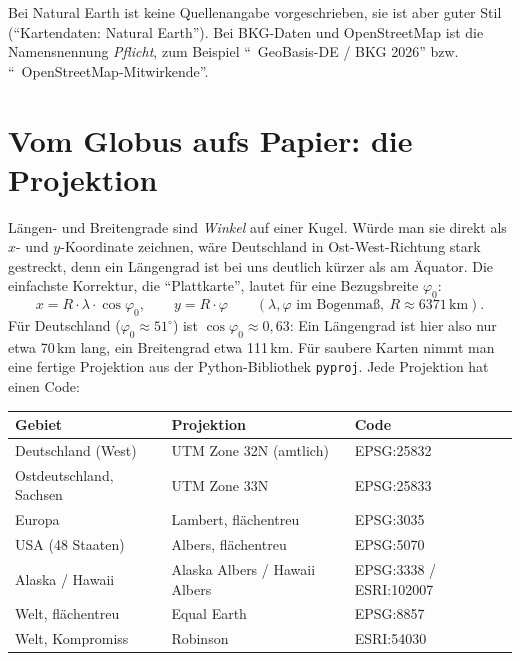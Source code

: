 \begin{hinweis}[Lizenz]
	Bei Natural Earth ist keine Quellenangabe vorgeschrieben, sie ist aber guter Stil (\enquote{Kartendaten: Natural Earth}). Bei BKG-Daten und OpenStreetMap ist die Namensnennung \textit{Pflicht}, zum Beispiel \enquote{\textcopyright\ GeoBasis-DE / BKG 2026} bzw. \enquote{\textcopyright\ OpenStreetMap-Mitwirkende}.
\end{hinweis}



\section{Vom Globus aufs Papier: die Projektion}

Längen- und Breitengrade sind \textit{Winkel} auf einer Kugel. Würde man sie direkt als $x$- und $y$-Koordinate zeichnen, wäre Deutschland in Ost-West-Richtung stark gestreckt, denn ein Längengrad ist bei uns deutlich kürzer als am Äquator. Die einfachste Korrektur, die \enquote{Plattkarte}, lautet für eine Bezugsbreite $\varphi_0$:
\[
	x = R\cdot\lambda\cdot\cos\varphi_0, \qquad y = R\cdot\varphi
	\qquad (\lambda,\varphi \text{ im Bogenmaß},\ R \approx 6371\,\mathrm{km}).
\]
Für Deutschland ($\varphi_0 \approx 51^\circ$) ist $\cos\varphi_0 \approx 0{,}63$: Ein Längengrad ist hier also nur etwa 70\,km lang, ein Breitengrad etwa 111\,km. Für saubere Karten nimmt man eine fertige Projektion aus der Python-Bibliothek \texttt{pyproj}. Jede Projektion hat einen Code:

\begin{center}
\small
\begin{tabular}{@{}lll@{}}
	\toprule
	\textbf{Gebiet} & \textbf{Projektion} & \textbf{Code} \\
	\midrule
	Deutschland (West) & UTM Zone 32N (amtlich) & EPSG:25832 \\
	Ostdeutschland, Sachsen & UTM Zone 33N & EPSG:25833 \\
	Europa & Lambert, flächentreu & EPSG:3035 \\
	USA (48 Staaten) & Albers, flächentreu & EPSG:5070 \\
	Alaska / Hawaii & Alaska Albers / Hawaii Albers & EPSG:3338 / ESRI:102007 \\
	Welt, flächentreu & Equal Earth & EPSG:8857 \\
	Welt, Kompromiss & Robinson & ESRI:54030 \\
	\bottomrule
\end{tabular}
\end{center}

